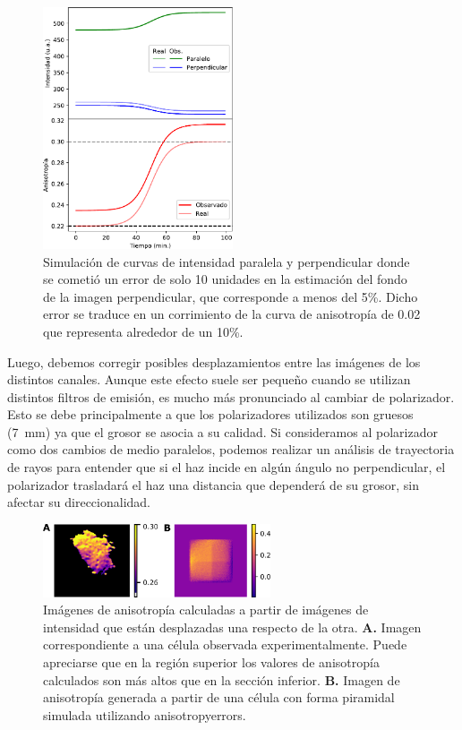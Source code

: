 \begin{figure}[htb]
    \centering
    \includegraphics[width=0.5\textwidth]{img/cap_2/error_bkg.pdf}
    \caption{\footnotesize{Simulación de curvas de intensidad paralela y perpendicular donde se cometió un error de solo 10 unidades en la estimación del fondo de la imagen perpendicular, que corresponde a menos del 5\%. Dicho error se traduce en un corrimiento de la curva de anisotropía de 0.02 que representa alrededor de un 10\%.}}
    \label{fig:error_bkg}
\end{figure}

Luego, debemos corregir posibles desplazamientos entre las imágenes de los distintos canales. Aunque este efecto suele ser pequeño cuando se utilizan distintos filtros de emisión, es mucho más pronunciado al cambiar de polarizador. Esto se debe principalmente a que los polarizadores utilizados son gruesos (7~mm) ya que el grosor se asocia a su calidad. Si consideramos al polarizador como dos cambios de medio paralelos, podemos realizar un análisis de trayectoria de rayos para entender que si el haz incide en algún ángulo no perpendicular, el polarizador trasladará el haz una distancia que dependerá de su grosor, sin afectar su direccionalidad.

\begin{figure}[b!]
    \centering
    \includegraphics[width=0.6\textwidth]{img/cap_2/shifts.png}
    \caption{\footnotesize{Imágenes de anisotropía calculadas a partir de imágenes de intensidad que están desplazadas una respecto de la otra. \textbf{A.} Imagen correspondiente a una célula observada experimentalmente. Puede apreciarse que en la región superior los valores de anisotropía calculados son más altos que en la sección inferior. \textbf{B.} Imagen de anisotropía generada a partir de una célula con forma piramidal simulada utilizando anisotropy\textunderscore errors.}}
    \label{fig:shifts}
\end{figure}

